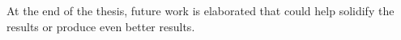 At the end of the thesis, future work is elaborated that could help solidify the results or produce even better results.




